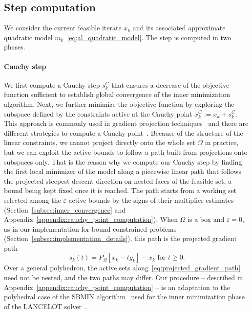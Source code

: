 \documentclass[pdflatex,sn-mathphys-num]{sn-jnl}%
\theoremstyle{thmstyleone}%
\newcommand{\proj}[2]{P_{#1} \left[ {#2} \right]} %
\begin{document}
\subsection{Step computation}\label{subsec:step_computation}

We consider the current feasible iterate $x_k$ and its associated approximate quadratic model $m_k$~\eqref{eq:al_quadratic_model}. The step is computed in two phases. 

\paragraph*{Cauchy step} We first compute a Cauchy step $s_k^C$ that ensures a decrease of the objective function sufficient to establish global convergence of the inner minimization algorithm. Next, we further minimize the objective function by exploring the subspace defined by the constraints active at the Cauchy point $x_k^C:=x_k+s_k^C$. This approach is commonly used in gradient projection techniques~\cite[Section~16.7]{nocedalwright:2006} and there are different strategies to compute a Cauchy point~\cite{conn-etal:1988b,moretoraldo:1991,linmore:1999a}. Because of the structure of the linear constraints, we cannot project directly onto the whole set $\Omega$ in practice, but we can exploit the active bounds to follow a path built from projections onto subspaces only. That is the reason why we compute our Cauchy step by finding the first local minimizer of the model along a piecewise linear path that follows the projected steepest descent direction on nested faces of the feasible set, a bound being kept fixed once it is reached. The path starts from a working set selected among the $\varepsilon$-active bounds by the signs of their multiplier estimates (Section~\ref{subsec:inner_convergence} and Appendix~\ref{appendix:cauchy_point_computation}). When $\Omega$ is a box and $\varepsilon = 0$, as in our implementation for bound-constrained problems (Section~\ref{subsec:implementation_details}), this path is the projected gradient path
\begin{equation}\label{eq:projected_gradient_path}
	s_k(t)=\proj{\Omega}{x_k-tg_k}-x_k \text{ for } t\ge 0.
\end{equation}
Over a general polyhedron, the active sets along~\eqref{eq:projected_gradient_path} need not be nested, and the two paths may differ.
Our procedure -- described in Appendix~\ref{appendix:cauchy_point_computation} -- is an adaptation to the polyhedral case of the SBMIN algorithm~\cite{conn-etal:1988b} used for the inner minimization phase of the LANCELOT solver~\cite{conn-etal:1992}.
\end{document}
